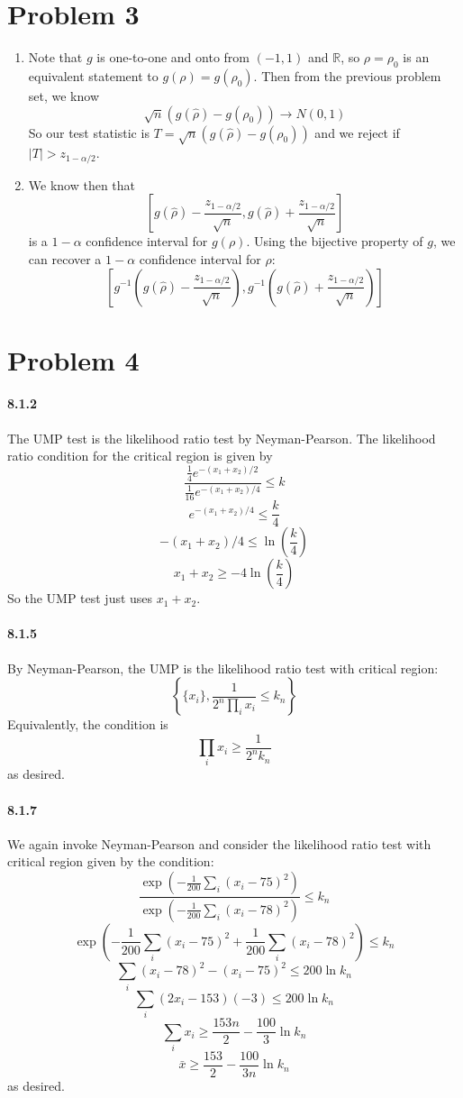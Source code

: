 \documentclass[10pt,letter]{article}
\begin{document}
\section*{Problem 3}
\begin{enumerate}[label=(\alph*)]
  \item Note that $g$ is one-to-one and onto from $(-1,1)$ and $\mathbb{R}$, so $\rho = \rho_0$ is an equivalent statement to $g(\rho) = g(\rho_0)$. Then from the previous problem set, we know
  \[ \sqrt{n}(g(\hat{\rho}) - g(\rho_0)) \to N(0,1) \]
  So our test statistic is $T = \sqrt{n}(g(\hat{\rho}) - g(\rho_0)) $ and we reject if $|T| > z_{1-\alpha/2}$.
  \item We know then that
  \[ \left[ g(\hat{\rho}) - \frac{z_{1-\alpha/2}}{\sqrt{n}},g(\hat{\rho}) + \frac{z_{1-\alpha/2}}{\sqrt{n}}  \right] \]
  is a $1-\alpha$ confidence interval for $g(\rho)$. Using the bijective property of $g$, we can recover a $1-\alpha$ confidence interval for $\rho$:
  \[ \left[ g^{-1}\left(g(\hat{\rho}) - \frac{z_{1-\alpha/2}}{\sqrt{n}}\right),g^{-1} \left( g(\hat{\rho}) + \frac{z_{1-\alpha/2}}{\sqrt{n}} \right) \right] \]

\end{enumerate}
\section*{Problem 4}
\paragraph*{8.1.2} The UMP test is the likelihood ratio test by Neyman-Pearson. The likelihood ratio condition for the critical region is given by
\[ \frac{\frac{1}{4}e^{-(x_1 + x_2)/2}}{\frac{1}{16} e^{-(x_1 + x_2)/4}} \le k \]
\[ e^{-(x_1 + x_2)/4} \le \frac{k}{4} \]
\[ -(x_1 + x_2)/4 \le \ln \left( \frac{k}{4} \right) \]
\[ x_1 + x_2  \ge - 4\ln \left( \frac{k}{4} \right) \]
So the UMP test just uses $x_1 + x_2$.
\paragraph*{8.1.5} By Neyman-Pearson, the UMP is the likelihood ratio test with critical region:
\[ \left\{ \{x_i\}, \frac{1}{2^n \prod_i x_i} \le k_n \right\} \]
Equivalently, the condition is
\[ \prod_i x_i \ge \frac{1}{2^n k_n} \]
as desired.
\paragraph*{8.1.7} We again invoke Neyman-Pearson and consider the likelihood ratio test with critical region given by the condition:
\[ \frac{\exp\left( - \frac{1}{200} \sum_i (x_i - 75)^2 \right)}{\exp\left( - \frac{1}{200} \sum_i (x_i - 78)^2 \right)} \le k_n \]
\[ \exp\left( - \frac{1}{200} \sum_i (x_i - 75)^2 + \frac{1}{200} \sum_i (x_i - 78)^2 \right) \le k_n \]
\[ \sum_i (x_i - 78)^2 -(x_i - 75)^2  \le 200 \ln k_n  \]
\[ \sum_i (2x_i - 153)(-3)  \le 200 \ln k_n  \]
\[ \sum_i x_i \ge \frac{153n}{2}-\frac{100}{3}\ln k_n \]
\[ \bar{x} \ge \frac{153}{2}-\frac{100}{3n}\ln k_n \]
as desired.
\end{document}
